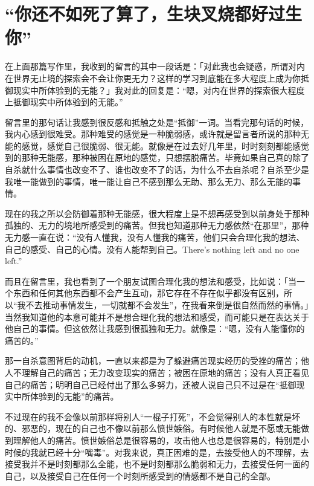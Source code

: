 \chapter{“你还不如死了算了，生块叉烧都好过生你”}



在上面那篇写作里，我收到的留言的其中一段话是：「对此我也会疑惑，所谓对内在世界无止境的探索会不会让你更无力？这样的学习到底能在多大程度上成为你抵御现实中所体验到的无能？」我对此的回复是：“嗯，对内在世界的探索很大程度上抵御现实中所体验到的无能。”

留言里的那句话让我感到很反感和抵触之处是“抵御”一词。当看完那句话的时候，我内心感到很难受。那种难受的感觉是一种脆弱感，或许就是留言者所说的那种无能的感觉，感觉自己很脆弱、很无能。就像是在过去好几年里，时时刻刻都能感觉到的那种无能感，那种被困在原地的感觉，只想摆脱痛苦。毕竟如果自己真的除了自杀就什么事情也改变不了、谁也改变不了的话，为什么不去自杀呢？自杀至少是我唯一能做到的事情，唯一能让自己不感到那么无助、那么无力、那么无能的事情。

现在的我之所以会防御着那种无能感，很大程度上是不想再感受到以前身处于那种孤独的、无力的境地所感受到的痛苦。但我也知道那种无力感依然“在那里”，那种无力感一直在说：“没有人懂我，没有人懂我的痛苦，他们只会合理化我的想法、自己的感受、自己的心情。没有人能帮到自己。There's nothing left and no one left.”

而且在留言里，我也看到了一个朋友试图合理化我的想法和感受，比如说：「当一个东西和任何其他东西都不会产生互动，那它存在不存在似乎都没有区别，所以“我不去推动事情发生，一切就都不会发生”，在我看来倒是很自然而然的事情。」当然我知道他的本意可能并不是想合理化我的想法和感受，而可能只是在表达关于他自己的事情。但这依然让我感到很孤独和无力。就像是：“嗯，没有人能懂你的痛苦的。”

那一自杀意图背后的动机，一直以来都是为了躲避痛苦\pozhehao{}现实经历的受挫的痛苦；他人不理解自己的痛苦；无力改变现实的痛苦；被困在原地的痛苦；没有人真正看见自己的痛苦；明明自己已经付出了那么多努力，还被人说自己只不过是在“抵御现实中所体验到的无能”的痛苦。

不过现在的我不会像以前那样将别人“一棍子打死”，不会觉得别人的本性就是坏的、邪恶的，现在的自己也不像以前那么愤世嫉俗。有时候他人就是不愿或无能做到理解他人的痛苦。愤世嫉俗总是很容易的，攻击他人也总是很容易的，特别是小时候的我就已经十分“嘴毒”。对我来说，真正困难的是，去接受他人的不理解，去接受我并不是时刻都那么全能，也不是时刻都那么脆弱和无力，去接受任何一面的自己，以及接受自己在任何一个时刻所感受到的情感都不是自己的全部。

